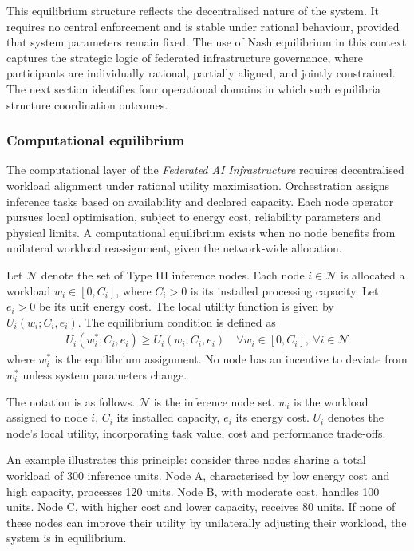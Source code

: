 \documentclass[oneside,10pt]{swissi}
\begin{document}
This equilibrium structure reflects the decentralised nature of the system. It requires no central enforcement and is stable under rational behaviour, provided that system parameters remain fixed. The use of Nash equilibrium in this context captures the strategic logic of federated infrastructure governance, where participants are individually rational, partially aligned, and jointly constrained. The next section identifies four operational domains in which such equilibria structure coordination outcomes.

\subsubsection{Computational equilibrium}

The computational layer of the \textit{Federated AI Infrastructure} requires decentralised workload alignment under rational utility maximisation. Orchestration assigns inference tasks based on availability and declared capacity. Each node operator pursues local optimisation, subject to energy cost, reliability parameters and physical limits. A computational equilibrium exists when no node benefits from unilateral workload reassignment, given the network-wide allocation.

Let \( \mathcal{N} \) denote the set of Type III inference nodes. Each node \( i \in \mathcal{N} \) is allocated a workload \( w_i \in [0, C_i] \), where \( C_i > 0 \) is its installed processing capacity. Let \( e_i > 0 \) be its unit energy cost. The local utility function is given by \( U_i(w_i; C_i, e_i) \). The equilibrium condition is defined as
\begin{align}
U_i(w_i^*; C_i, e_i) \ge U_i(w_i; C_i, e_i) \quad \forall w_i \in [0, C_i],\ \forall i \in \mathcal{N}
\end{align}
where \( w_i^* \) is the equilibrium assignment. No node has an incentive to deviate from \( w_i^* \) unless system parameters change.

The notation is as follows. \( \mathcal{N} \) is the inference node set. \( w_i \) is the workload assigned to node \( i \), \( C_i \) its installed capacity, \( e_i \) its energy cost. \( U_i \) denotes the node’s local utility, incorporating task value, cost and performance trade-offs.

An example illustrates this principle: consider three nodes sharing a total workload of 300 inference units. Node A, characterised by low energy cost and high capacity, processes 120 units. Node B, with moderate cost, handles 100 units. Node C, with higher cost and lower capacity, receives 80 units. If none of these nodes can improve their utility by unilaterally adjusting their workload, the system is in equilibrium.
\end{document}
